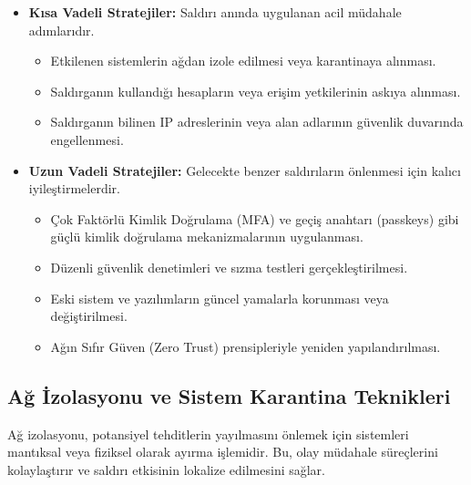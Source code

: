 \begin{itemize}
\begin{itemize}
    \item \textbf{Kısa Vadeli Stratejiler:} Saldırı anında uygulanan acil müdahale adımlarıdır.
    \begin{itemize}
        \item Etkilenen sistemlerin ağdan izole edilmesi veya karantinaya alınması.
        \item Saldırganın kullandığı hesapların veya erişim yetkilerinin askıya alınması.
        \item Saldırganın bilinen IP adreslerinin veya alan adlarının güvenlik duvarında engellenmesi.
    \end{itemize}
    \item \textbf{Uzun Vadeli Stratejiler:} Gelecekte benzer saldırıların önlenmesi için kalıcı iyileştirmelerdir.
    \begin{itemize}
        \item Çok Faktörlü Kimlik Doğrulama (MFA) ve geçiş anahtarı (passkeys) gibi güçlü kimlik doğrulama mekanizmalarının uygulanması.
        \item Düzenli güvenlik denetimleri ve sızma testleri gerçekleştirilmesi.
        \item Eski sistem ve yazılımların güncel yamalarla korunması veya değiştirilmesi.
        \item Ağın Sıfır Güven (Zero Trust) prensipleriyle yeniden yapılandırılması.
    \end{itemize}
\end{itemize}

\subsection{Ağ İzolasyonu ve Sistem Karantina Teknikleri}

Ağ izolasyonu, potansiyel tehditlerin yayılmasını önlemek için sistemleri mantıksal veya fiziksel olarak ayırma işlemidir. Bu, olay müdahale süreçlerini kolaylaştırır ve saldırı etkisinin lokalize edilmesini sağlar.


\end{itemize}
